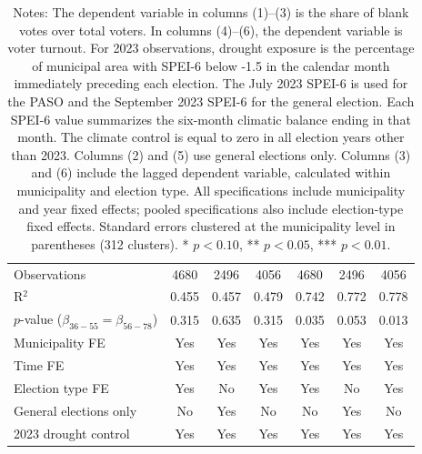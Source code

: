 \begin{table}[!h]
\begin{tabular}[t]{lcccccc}
\addlinespace
Observations & 4680 & 2496 & 4056 & 4680 & 2496 & 4056\\
R$^2$ & 0.455 & 0.457 & 0.479 & 0.742 & 0.772 & 0.778\\
$p$-value ($\beta_{36{-}55} = \beta_{56{-}78}$) & 0.315 & 0.635 & 0.315 & 0.035 & 0.053 & 0.013\\
Municipality FE & Yes & Yes & Yes & Yes & Yes & Yes\\
Time FE & Yes & Yes & Yes & Yes & Yes & Yes\\
Election type FE & Yes & No & Yes & Yes & No & Yes\\
General elections only & No & Yes & No & No & Yes & No\\
2023 drought control & Yes & Yes & Yes & Yes & Yes & Yes\\
\hline
\end{tabular}
\vspace{0.3em}
\captionsetup{justification=justified, singlelinecheck=false}
\caption*{\footnotesize Notes: The dependent variable in columns (1)--(3) is the share of blank votes over total voters. In columns (4)--(6), the dependent variable is voter turnout. For 2023 observations, drought exposure is the percentage of municipal area with SPEI-6 below -1.5 in the calendar month immediately preceding each election. The July 2023 SPEI-6 is used for the PASO and the September 2023 SPEI-6 for the general election. Each SPEI-6 value summarizes the six-month climatic balance ending in that month. The climate control is equal to zero in all election years other than 2023. Columns (2) and (5) use general elections only. Columns (3) and (6) include the lagged dependent variable, calculated within municipality and election type. All specifications include municipality and year fixed effects; pooled specifications also include election-type fixed effects. Standard errors clustered at the municipality level in parentheses (312 clusters). * $p<0.10$, ** $p<0.05$, *** $p<0.01$.}
\end{table}
